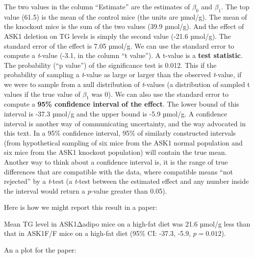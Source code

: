 \documentclass[]{book}
\begin{document}
The two values in the column ``Estimate'' are the estimates of \(\beta_0\) and \(\beta_1\). The top value (61.5) is the mean of the control mice (the units are µmol/g). The mean of the knockout mice is the sum of the two values (39.9 µmol/g). And the effect of ASK1 deletion on TG levels is simply the second value (-21.6 µmol/g). The standard error of the effect is 7.05 µmol/g. We can use the standard error to compute a \emph{t}-value (-3.1, in the column ``t value''). A t-value is a \textbf{test statistic}. The probability (``p value'') of the significance test is 0.012. This if the probability of sampling a \emph{t}-value as large or larger than the observed \emph{t}-value, if we were to sample from a null distribution of \emph{t}-values (a distribution of sampled t values if the true value of \(\beta_1\) was 0). We can also use the standard error to compute a \textbf{95\% confidence interval of the effect}. The lower bound of this interval is -37.3 µmol/g and the upper bound is -5.9 µmol/g. A confidence interval is another way of communicating uncertainty, and the way advocated in this text. In a 95\% confidence interval, 95\% of similarly constructed intervals (from hypothetical sampling of six mice from the ASK1 normal population and six mice from the ASK1 knockout population) will contain the true mean. Another way to think about a confidence interval is, it is the range of true differences that are compatible with the data, where compatible means ``not rejected'' by a \emph{t}-test (a \emph{t}-test between the estimated effect and any number inside the interval would return a \emph{p}-value greater than 0.05).

Here is how we might report this result in a paper:

Mean TG level in ASK1Δadipo mice on a high-fat diet was 21.6 µmol/g less than that in ASK1F/F mice on a high-fat diet (95\% CI: -37.3, -5.9, \(p = 0.012\)).

An a plot for the paper:
\end{document}
